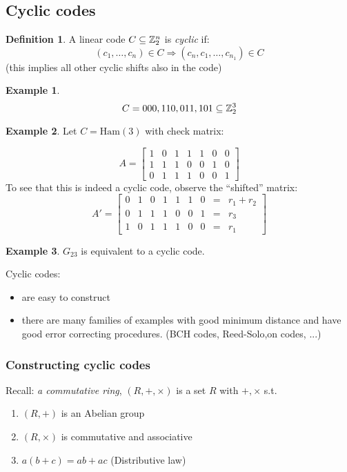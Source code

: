 \documentclass[]{article}
\theoremstyle{definition}
\newtheorem*{defn}{Definition}
\newtheorem*{exmp}{Example}
\theoremstyle{remark}
\numberwithin{equation}{section}
\begin{document}
	\subsection{Cyclic codes}
		\begin{defn} A linear code $C \subseteq \mathbb{Z}_2^n$ is \emph{cyclic} if:
		\[
			(c_1, \hdots, c_n) \in C \Rightarrow (c_n, c_1, \hdots, c_{n_1}) \in C
		\]
		(this implies all other cyclic shifts also in the code)
		\end{defn}

		\begin{exmp}
			\[C = {000, 110, 011, 101 } \subseteq \mathbb{Z}_2^3\]
		\end{exmp}

		\begin{exmp}
			Let $C= \text{Ham}(3)$ with check matrix:

			\[
			A = \begin{bmatrix}
				1 & 0 & 1 & 1 & 1 & 0 & 0 \\
				1 & 1 & 1 & 0 & 0 & 1 & 0 \\
				0 & 1 & 1 & 1 & 0 & 0 & 1
				\end{bmatrix}
			\]
			To see that this is indeed a cyclic code, observe the ``shifted'' matrix:
			\[
			A' = \begin{bmatrix}
				0 & 1 & 0 & 1 & 1 & 1 & 0 & = &r_1 + r_2 \\
				0 & 1 & 1 & 1 & 0 & 0 & 1 & = &r_3 \\
				1 & 0 & 1 & 1 & 1 & 0 & 0 & = &r_1
				\end{bmatrix}
			\]
		\end{exmp}
		\begin{exmp}
			$G_{23}$ is equivalent to a cyclic code.\\
		\end{exmp}
		Cyclic codes:
		\begin{itemize}
			\item are easy to construct
			\item there are many families of examples with good minimum distance and have good error correcting procedures. (BCH codes, Reed-Solo,on codes, ...)
		\end{itemize}
		\subsubsection{Constructing cyclic codes}
			Recall: \emph{a commutative ring}, $(R, +, \times)$ is a set $R$ with $+, \times$ s.t.
			\begin{enumerate}
				\item $(R,+)$ is an Abelian group
				\item $(R,\times)$ is commutative and associative
				\item $a(b+c) = ab + ac$ (Distributive law)
			\end{enumerate}
\end{document}
